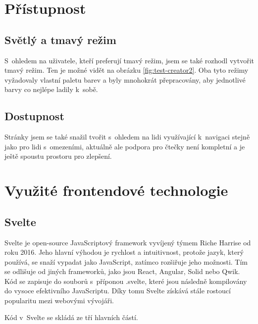 \documentclass[12pt, a4paper,
openright
]{report}
\begin{document}
\section{Přístupnost}

\subsection{Světlý a tmavý režim}
S~ohledem na uživatele, kteří preferují tmavý režim, jsem se také rozhodl vytvořit tmavý režim. Ten je možné vidět na obrázku \ref{fig:test-creator2}. Oba tyto režimy vyžadovaly vlastní paletu barev a byly mnohokrát přepracovány, aby jednotlivé barvy co nejlépe ladily k~sobě.

\subsection{Dostupnost}
Stránky jsem se také snažil tvořit s~ohledem na lidi využívající  k~navigaci stejně jako pro lidi s~omezeními, aktuálně ale podpora pro čtečky není kompletní a je ještě spoustu prostoru pro zlepšení.

\clearpage
\section{Využité frontendové technologie}
\subsection{Svelte}
Svelte je open-source JavaScriptový framework vyvíjený týmem Riche Harrise od roku 2016. Jeho hlavní výhodou je rychlost a intuitivnost, protože jazyk, který používá, se snaží vypadat jako JavaScript, zatímco rozšiřuje jeho možnosti. Tím se odlišuje od jiných frameworků, jako jsou React, Angular, Solid nebo Qwik. Kód se zapisuje do souborů s~příponou .svelte, které jsou následně kompilovány do vysoce efektivního JavaScriptu. Díky tomu Svelte získává stále rostoucí popularitu mezi webovými vývojáři. 

Kód v~Svelte se skládá ze tří hlavních částí.
\end{document}

